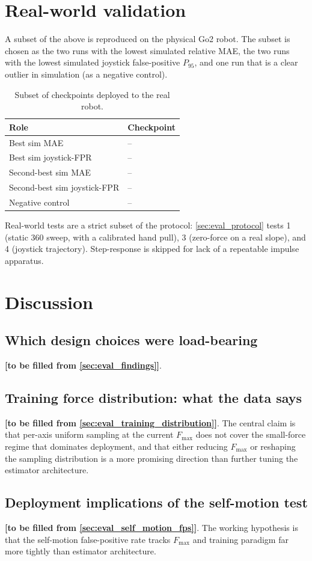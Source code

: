 \section{Real-world validation}
\label{sec:eval_real}

A subset of the above is reproduced on the physical Go2 robot. The
subset is chosen as the two runs with the lowest simulated relative MAE,
the two runs with the lowest simulated joystick false-positive
$P_{95}$, and one run that is a clear outlier in simulation (as a
negative control).

\begin{table}[h]
\centering
\caption{Subset of checkpoints deployed to the real robot.}
\label{tab:eval_real_runs}
\begin{tabular}{ll}
\hline
Role & Checkpoint \\ \hline \hline
Best sim MAE                     & -- \\
Best sim joystick-FPR            & -- \\
Second-best sim MAE              & -- \\
Second-best sim joystick-FPR     & -- \\
Negative control                 & -- \\
\hline
\end{tabular}
\end{table}

Real-world tests are a strict subset of the protocol:
\cref{sec:eval_protocol} tests 1 (static 360\textdegree{} sweep, with a
calibrated hand pull), 3 (zero-force on a real slope), and 4 (joystick
trajectory). Step-response is skipped for lack of a repeatable impulse
apparatus.

\section{Discussion}
\label{sec:eval_discussion}

\subsection{Which design choices were load-bearing}
\textbf{[to be filled from \cref{sec:eval_findings}]}.

\subsection{Training force distribution: what the data says}
\textbf{[to be filled from \cref{sec:eval_training_distribution}]}. The
central claim is that per-axis uniform sampling at the current
$F_{\max}$ does not cover the small-force regime that dominates
deployment, and that either reducing $F_{\max}$ or reshaping the
sampling distribution is a more promising direction than further
tuning the estimator architecture.

\subsection{Deployment implications of the self-motion test}
\textbf{[to be filled from \cref{sec:eval_self_motion_fps}]}. The
working hypothesis is that the self-motion false-positive rate tracks
$F_{\max}$ and training paradigm far more tightly than estimator
architecture.
